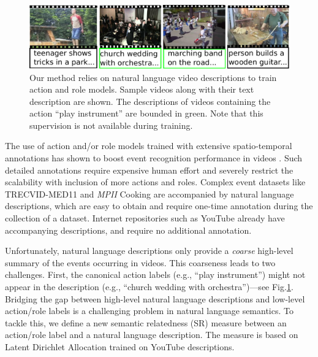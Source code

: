 \documentclass[10pt,twocolumn,letterpaper]{article}
\begin{document}
\begin{figure}[ht!]
\centering
   \includegraphics[scale = 0.4]{../images/pullFigure_2.pdf}
      \caption{Our method relies on natural language video descriptions to
      train action and role models. Sample videos along with their text
      description are shown. The descriptions of videos containing the action
      ``play instrument'' are bounded in green.
      Note that this supervision is not available during training.}
\label{fig:pull_figure}
\end{figure}

The use of action and/or role models trained with extensive spatio-temporal
annotations has shown to boost event recognition performance in videos
\cite{Izadinia_ECCV12, Lan_CVPR12}. Such detailed annotations require expensive
human effort and severely restrict the scalability with inclusion of more
actions and roles.
Complex event datasets like TRECVID-MED11 \cite{MED11} and \textit{MPII} Cooking
\cite{Regneri_TACL13} are accompanied by natural language descriptions,
which are easy to obtain and require one-time annotation during the
collection of a dataset.
Internet repositories such as YouTube already have accompanying descriptions,
and require no additional annotation.

Unfortunately,
natural language descriptions only provide a \emph{coarse} high-level summary of the events
occurring in videos.
This coarseness leads to two challenges.
First, the canonical action labels (e.g., ``play instrument'')
might not appear in the description (e.g., ``church wedding with orchestra'')---see
Fig.\ref{fig:pull_figure}.
Bridging the gap between high-level natural language descriptions and low-level action/role labels
is a challenging problem in natural language semantics.
To tackle this, we define a new semantic
relatedness (SR) measure between an action/role label and a natural language description.
The measure is based on Latent Dirichlet Allocation \cite{???} trained on
YouTube descriptions.
\end{document}
